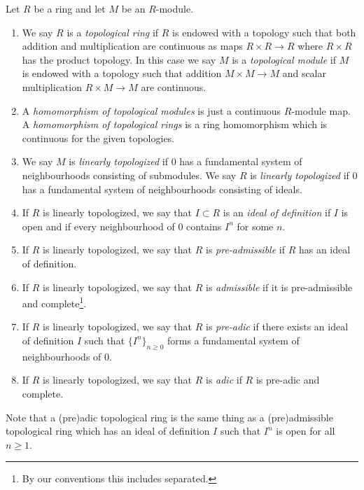 \begin{definition}
\label{definition-topological-ring}
\begin{reference}
\cite[Sections 7.1 and 7.2]{EGA1}
\end{reference}
Let $R$ be a ring and let $M$ be an $R$-module.
\begin{enumerate}
\item We say $R$ is a {\it topological ring} if $R$ is endowed with a topology
such that both addition and multiplication are continuous as maps
$R \times R \to R$ where $R \times R$ has the product topology.
In this case we say $M$ is a {\it topological module} if $M$ is endowed
with a topology such that addition $M \times M \to M$ and
scalar multiplication $R \times M \to M$ are continuous.
\item A {\it homomorphism of topological modules} is just a continuous
$R$-module map. A {\it homomorphism of topological rings} is a
ring homomorphism which is continuous for the given topologies.
\item We say $M$ is {\it linearly topologized} if $0$ has a fundamental
system of neighbourhoods consisting of submodules. We say $R$ is
{\it linearly topologized} if $0$ has a fundamental system of neighbourhoods
consisting of ideals.
\item If $R$ is linearly topologized, we say that $I \subset R$ is an
{\it ideal of definition} if $I$ is open and if every neighbourhood
of $0$ contains $I^n$ for some $n$.
\item If $R$ is linearly topologized, we say that $R$ is {\it pre-admissible}
if $R$ has an ideal of definition.
\item If $R$ is linearly topologized, we say that $R$ is {\it admissible} if
it is pre-admissible and
complete\footnote{By our conventions this includes separated.}.
\item If $R$ is linearly topologized, we say that $R$ is {\it pre-adic} if
there exists an ideal of definition $I$ such that $\{I^n\}_{n \geq 0}$
forms a fundamental system of neighbourhoods of $0$.
\item If $R$ is linearly topologized, we say that $R$ is {\it adic} if
$R$ is pre-adic and complete.
\end{enumerate}
Note that a (pre)adic topological ring is the same thing as a (pre)admissible
topological ring which has an ideal of definition $I$ such that $I^n$ is
open for all $n \geq 1$.
\end{definition}

